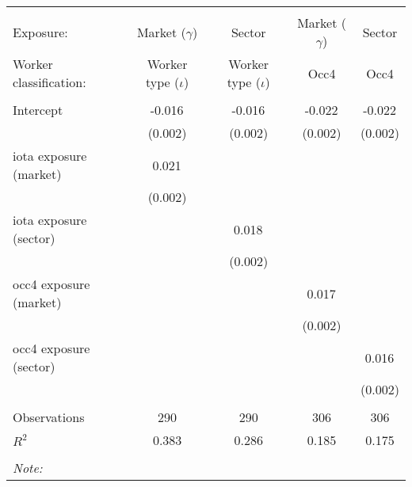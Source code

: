 \begin{tabular}{@{\extracolsep{5pt}}lcccc}
\\[-1.8ex]\hline
\hline \\[-1.8ex]
\hline \\[-1.8ex]
 Exposure: & Market ($\gamma$) & Sector & Market ($\gamma$) & Sector \\
 Worker classification: & Worker type ($\iota$) & Worker type ($\iota$) & Occ4 & Occ4 \\
 \hline &  &  &  &  \\
 Intercept & -0.016$^{}$ & -0.016$^{}$ & -0.022$^{}$ & -0.022$^{}$ \\
  & (0.002) & (0.002) & (0.002) & (0.002) \\
 iota exposure (market) & 0.021$^{}$ & & & \\
  & (0.002) & & & \\
 iota exposure (sector) & & 0.018$^{}$ & & \\
  & & (0.002) & & \\
 occ4 exposure (market) & & & 0.017$^{}$ & \\
  & & & (0.002) & \\
 occ4 exposure (sector) & & & & 0.016$^{}$ \\
  & & & & (0.002) \\
\hline \\[-1.8ex]
 Observations & 290 & 290 & 306 & 306 \\
 $R^2$ & 0.383 & 0.286 & 0.185 & 0.175 \\
\hline
\hline \\[-1.8ex]
\textit{Note:}\end{tabular}